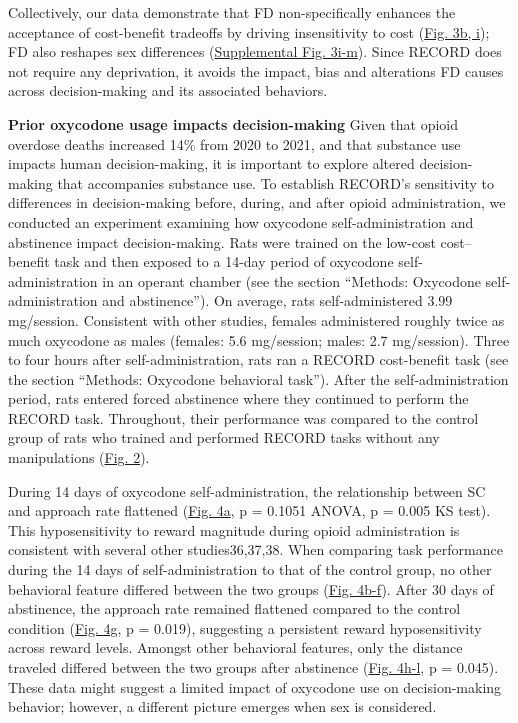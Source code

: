 \documentclass{article}
\begin{document}
\vspace{1em}

Collectively, our data demonstrate that FD non-specifically enhances the acceptance of cost-benefit tradeoffs by driving insensitivity to cost (\hyperref[fig:Record_main_3]{Fig. 3b, i}); FD also reshapes sex differences (\hyperref[fig:Record_SI_3]{Supplemental Fig. 3i-m}). Since RECORD does not require any deprivation, it avoids the impact, bias and alterations FD causes across decision-making and its associated behaviors.

\vspace{1em}

\noindent\textbf{Prior oxycodone usage impacts decision-making}
Given that opioid overdose deaths increased 14\% from 2020 to 2021, and that substance use impacts human decision-making\cite{bechara2005decision}, it is important to explore altered decision-making that accompanies substance use. To establish RECORD’s sensitivity to differences in decision-making before, during, and after opioid administration, we conducted an experiment examining how oxycodone self-administration and abstinence impact decision-making. Rats were trained on the low-cost cost–benefit task and then exposed to a 14-day period of oxycodone self-administration in an operant chamber (see the section “Methods: Oxycodone self-administration and abstinence”). On average, rats self-administered 3.99 mg/session. Consistent with other studies\cite{zanni2020female}, females administered roughly twice as much oxycodone as males (females: 5.6 mg/session; males: 2.7 mg/session). Three to four hours after self-administration, rats ran a RECORD cost-benefit task (see the section “Methods: Oxycodone behavioral task”). After the self-administration period, rats entered forced abstinence where they continued to perform the RECORD task. Throughout, their performance was compared to the control group of rats who trained and performed RECORD tasks without any manipulations (\hyperref[fig:Record_main_2]{Fig. 2}).

\vspace{1em}

During 14 days of oxycodone self-administration, the relationship between SC and approach rate flattened (\hyperref[fig:Record_main_4]{Fig. 4a}, p = 0.1051 ANOVA, p = 0.005 KS test). This hyposensitivity to reward magnitude during opioid administration is consistent with several other studies36,37,38. When comparing task performance during the 14 days of self-administration to that of the control group, no other behavioral feature differed between the two groups (\hyperref[fig:Record_main_4]{Fig. 4b-f}). After 30 days of abstinence, the approach rate remained flattened compared to the control condition (\hyperref[fig:Record_main_4]{Fig. 4g}, p = 0.019), suggesting a persistent reward hyposensitivity across reward levels. Amongst other behavioral features, only the distance traveled differed between the two groups after abstinence (\hyperref[fig:Record_main_4]{Fig. 4h-l}, p = 0.045). These data might suggest a limited impact of oxycodone use on decision-making behavior; however, a different picture emerges when sex is considered.
\end{document}
